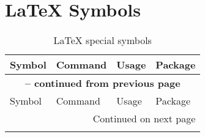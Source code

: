
\chapter{\LaTeX{} Symbols}

\begin{longtable}{|l|l|l|l|}
	\caption{\LaTeX{} special symbols} \label{table: latex special symbols} \\
	
	\hline
	Symbol & Command & Usage & Package\\
	\hline
	\endfirsthead
	
	\multicolumn{4}{c}{{\bfseries \tablename{} \thetable{} -- continued from previous page}}\\
	\hline
	Symbol & Command & Usage & Package\\
	\hline
	\endhead
	
	\multicolumn{4}{r}{Continued on next page}\\
	\hline
	\endfoot
	
	\hline \hline
	\endlastfoot
	

\end{longtable}
